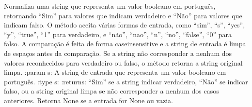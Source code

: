 \documentclass[letterpaper,10pt,english]{sphinxmanual}
\begin{document}
\begin{fulllineitems}
\label{\detokenize{api/formatters:formatters.normalize_bool_ptbr}}
\pysigstartsignatures
\pysiglinewithargsret
{}
{}
{}
\pysigstopsignatures
\sphinxAtStartPar
Normaliza uma string que representa um valor booleano em português, retornando “Sim” para valores que indicam verdadeiro e “Não” para valores que indicam falso. O método aceita várias formas de entrada, como “sim”, “s”, “yes”, “y”, “true”, “1” para verdadeiro, e “não”, “nao”, “n”, “no”, “false”, “0” para falso. A comparação é feita de forma case\sphinxhyphen{}insensitive e a string de entrada é limpa de espaços antes da comparação. Se a string não corresponder a nenhum dos valores reconhecidos para verdadeiro ou falso, o método retorna a string original limpa.
:param s: A string de entrada que representa um valor booleano em português.
:type s: 
:returns: “Sim” se a string indicar verdadeiro, “Não” se indicar falso, ou a string original limpa se não corresponder a nenhum dos casos anteriores. Retorna None se a entrada for None ou vazia.
\begin{quote}\begin{description}
\sphinxAtStartPar
{}

\end{description}\end{quote}

\end{fulllineitems}

\end{document}
